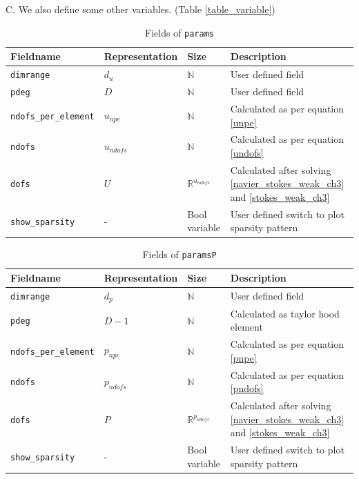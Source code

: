 \documentclass[a4paper,openany]{book}
\begin{document}
C. We also define some other variables. (Table \ref{table_variable})\\

\begin{table}
\cprotect\caption{Fields of \verb|params|}
\label{table_params}
\begin{center}
\begin{tabular}{| p{}| p{} |  p{} | p{}|} 
\hline
\textbf{Fieldname} & \textbf{Representation} & \textbf{Size} & \textbf{Description}\\
\hline
\verb|dimrange| & $d_u$ & $\mathbb{N}$ & User defined field\\
\hline
\verb|pdeg| & $D$ & $\mathbb{N}$ & User defined field\\
\hline
\verb|ndofs_per_element| & $u_{npe}$ & $\mathbb{N}$ & Calculated as per equation \ref{unpe}\\
\hline
\verb|ndofs| & $u_{ndofs}$ & $\mathbb{N}$ & Calculated as per equation \ref{undofs}\\
\hline
\verb|dofs| & $U$ & $\mathbb{R}^{u_{ndofs}}$ & Calculated after solving \ref{navier_stokes_weak_ch3} and \ref{stokes_weak_ch3}\\
\hline
\verb|show_sparsity| & - & Bool variable & User defined switch to plot sparsity pattern\\
\hline
\end{tabular}
\end{center}
\end{table}

\begin{table}
\cprotect\caption{Fields of \verb|paramsP|}
\label{table_paramsP}
\begin{center}
\begin{tabular}{| p{}| p{} |  p{} | p{}|}
\hline
\textbf{Fieldname} & \textbf{Representation} & \textbf{Size} & \textbf{Description}\\
\hline
\verb|dimrange| & $d_p$ & $\mathbb{N}$ & User defined field\\
\hline
\verb|pdeg| & $D-1$ & $\mathbb{N}$ & Calculated as taylor hood element\\
\hline
\verb|ndofs_per_element| & $p_{npe}$ & $\mathbb{N}$ & Calculated as per equation \ref{pnpe}\\
\hline
\verb|ndofs| & $p_{ndofs}$ & $\mathbb{N}$ & Calculated as per equation \ref{pndofs}\\
\hline
\verb|dofs| & $P$ & $\mathbb{R}^{p_{ndofs}}$ & Calculated after solving \ref{navier_stokes_weak_ch3} and \ref{stokes_weak_ch3}\\
\hline
\verb|show_sparsity| & - & Bool variable & User defined switch to plot sparsity pattern\\
\hline
\end{tabular}
\end{center}
\end{table}
\end{document}
